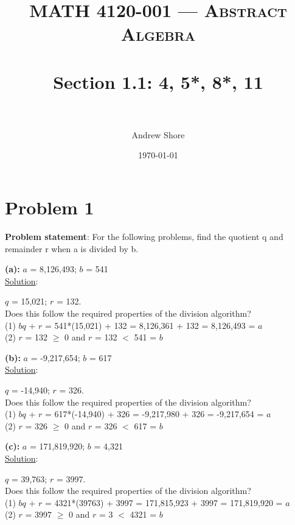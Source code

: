 \documentclass{article} %
\title{ 
\normalfont \normalsize 
\textsc{MATH 4120-001 --- Abstract Algebra} \\
\horrule{0.5pt} \\[0cm] %
\huge Section 1.1: 4, 5*, 8*, 11 \\ %
\horrule{2pt} \\[0cm] %
}
\author{Andrew Shore} %
\date{\normalsize\today} %
\begin{document}
\maketitle %

\section*{Problem 1}
\textbf{Problem statement}: 
For the following problems, find the quotient q and remainder r when a is divided by b. 
\\


\begin{addmargin}[1em]{0em}
\textbf{(a):} $a$ = 8,126,493; $b$ = 541 \\
\underline{Solution}: 
\begin{addmargin}[1em]{0em}
$q$ = 15,021; $r$ = 132. \\
Does this follow the required properties of the division algorithm? \\
(1) $bq$ + $r$ = 541*(15,021) + 132 = 8,126,361 + 132 = 8,126,493 = $a$ \checkmark\\
(2) $r$ = 132 $\geq$ 0 and $r$ = 132 $<$ 541 = $b$ \checkmark
\end{addmargin} 
\hfill \break

\textbf{(b):} $a$ = -9,217,654; $b$ = 617 \\
\underline{Solution}: 
\begin{addmargin}[1em]{0em}
$q$ = -14,940; $r$ = 326. \\
Does this follow the required properties of the division algorithm? \\
(1) $bq$ + $r$ = 617*(-14,940) + 326 = -9,217,980 + 326 = -9,217,654 = $a$ \checkmark\\
(2) $r$ = 326 $\geq$ 0 and $r$ = 326 $<$ 617 = $b$ \checkmark
\end{addmargin} 
\hfill \break

\textbf{(c):} $a$ = 171,819,920; $b$ = 4,321 \\
\underline{Solution}: 
\begin{addmargin}[1em]{0em}
$q$ = 39,763; $r$ = 3997. \\
Does this follow the required properties of the division algorithm? \\
(1) $bq$ + $r$ = 4321*(39763) + 3997 = 171,815,923 + 3997 = 171,819,920 = $a$ \checkmark\\
(2) $r$ = 3997 $\geq$ 0 and $r$ = 3 $<$ 4321 = $b$ \checkmark
\end{addmargin} 
\end{addmargin}  
\end{document}
